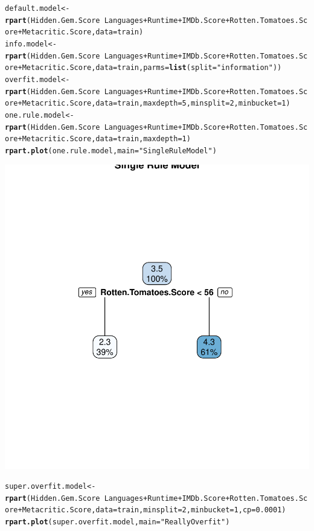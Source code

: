 \documentclass{article}\usepackage[]{graphicx}\usepackage[]{color}
\makeatletter
\newcommand{\hlnum}[1]{\textcolor[rgb]{0.686,0.059,0.569}{#1}}%
\newcommand{\hlstr}[1]{\textcolor[rgb]{0.192,0.494,0.8}{#1}}%
\newcommand{\hlopt}[1]{\textcolor[rgb]{0,0,0}{#1}}%
\newcommand{\hlstd}[1]{\textcolor[rgb]{0.345,0.345,0.345}{#1}}%
\newcommand{\hlkwb}[1]{\textcolor[rgb]{0.69,0.353,0.396}{#1}}%
\newcommand{\hlkwc}[1]{\textcolor[rgb]{0.333,0.667,0.333}{#1}}%
\newcommand{\hlkwd}[1]{\textcolor[rgb]{0.737,0.353,0.396}{\textbf{#1}}}%
\newenvironment{kframe}{%
 \def\at@end@of@kframe{}%
 \ifinner\ifhmode%
  \def\at@end@of@kframe{\end{minipage}}%
  \begin{minipage}{\columnwidth}%
 \fi\fi%
 \def\FrameCommand##1{\hskip\@totalleftmargin \hskip-\fboxsep
 \colorbox{shadecolor}{##1}\hskip-\fboxsep
     \hskip-\linewidth \hskip-\@totalleftmargin \hskip\columnwidth}%
 \MakeFramed {\advance\hsize-\width
   \@totalleftmargin\z@ \linewidth\hsize
   \@setminipage}}%
 {\par\unskip\endMakeFramed%
 \at@end@of@kframe}
\newenvironment{knitrout}{}{} %
\makeatother
\begin{document}
\begin{knitrout}
\begin{kframe}\begin{alltt}
\hlstd{default.model} \hlkwb{<-} \hlkwd{rpart}\hlstd{(Hidden.Gem.Score}\hlopt{~}\hlstd{Languages}\hlopt{+}\hlstd{Runtime}\hlopt{+}\hlstd{IMDb.Score}\hlopt{+}\hlstd{Rotten.Tomatoes.Score}\hlopt{+}\hlstd{Metacritic.Score,} \hlkwc{data} \hlstd{= train)}
\hlstd{info.model} \hlkwb{<-} \hlkwd{rpart}\hlstd{(Hidden.Gem.Score}\hlopt{~}\hlstd{Languages}\hlopt{+}\hlstd{Runtime}\hlopt{+}\hlstd{IMDb.Score}\hlopt{+}\hlstd{Rotten.Tomatoes.Score}\hlopt{+}\hlstd{Metacritic.Score,} \hlkwc{data} \hlstd{= train,} \hlkwc{parms}\hlstd{=}\hlkwd{list}\hlstd{(}\hlkwc{split}\hlstd{=}\hlstr{"information"}\hlstd{))}
\hlstd{overfit.model} \hlkwb{<-} \hlkwd{rpart}\hlstd{(Hidden.Gem.Score}\hlopt{~}\hlstd{Languages}\hlopt{+}\hlstd{Runtime}\hlopt{+}\hlstd{IMDb.Score}\hlopt{+}\hlstd{Rotten.Tomatoes.Score}\hlopt{+}\hlstd{Metacritic.Score,} \hlkwc{data} \hlstd{= train,}\hlkwc{maxdepth}\hlstd{=} \hlnum{5}\hlstd{,} \hlkwc{minsplit}\hlstd{=}\hlnum{2}\hlstd{,}\hlkwc{minbucket} \hlstd{=} \hlnum{1}\hlstd{)}
\hlstd{one.rule.model}\hlkwb{<-} \hlkwd{rpart}\hlstd{(Hidden.Gem.Score}\hlopt{~}\hlstd{Languages}\hlopt{+}\hlstd{Runtime}\hlopt{+}\hlstd{IMDb.Score}\hlopt{+}\hlstd{Rotten.Tomatoes.Score}\hlopt{+}\hlstd{Metacritic.Score,} \hlkwc{data} \hlstd{= train,} \hlkwc{maxdepth} \hlstd{=}\hlnum{1}\hlstd{)}
\hlkwd{rpart.plot}\hlstd{(one.rule.model,} \hlkwc{main}\hlstd{=}\hlstr{"Single Rule Model"}\hlstd{)}
\end{alltt}
\end{kframe}

{\centering \includegraphics[width=.6\linewidth]{figure/Task2-Rnwauto-report-2} 

}


\begin{kframe}\begin{alltt}
\hlstd{super.overfit.model} \hlkwb{<-} \hlkwd{rpart}\hlstd{(Hidden.Gem.Score}\hlopt{~}\hlstd{Languages}\hlopt{+}\hlstd{Runtime}\hlopt{+}\hlstd{IMDb.Score}\hlopt{+}\hlstd{Rotten.Tomatoes.Score}\hlopt{+}\hlstd{Metacritic.Score,} \hlkwc{data} \hlstd{= train,} \hlkwc{minsplit}\hlstd{=}\hlnum{2}\hlstd{,}\hlkwc{minbucket} \hlstd{=} \hlnum{1}\hlstd{,} \hlkwc{cp} \hlstd{=} \hlnum{0.0001}\hlstd{)}
\hlkwd{rpart.plot}\hlstd{(super.overfit.model,} \hlkwc{main} \hlstd{=} \hlstr{"Really Overfit"}\hlstd{)}
\end{alltt}



\end{kframe}
\end{knitrout}
\end{document}
